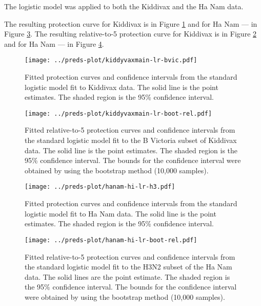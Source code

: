 The logistic model was applied to both the Kiddivax and the Ha Nam data.

The resulting protection curve for Kiddivax is in Figure \ref{fig:kiddyvaxmain-prot-lr} and for Ha Nam --- in Figure \ref{fig:hanam-prot-lr}. The resulting relative-to-5 protection curve for Kiddivax is in Figure \ref{fig:kiddyvaxmain-prot-rel-lr-boot} and for Ha Nam --- in Figure \ref{fig:hanam-prot-rel-lr-boot}.

\begin{figure}[htp]
    \centering
    \texttt{[image: ../preds-plot/kiddyvaxmain-lr-bvic.pdf]}
    \caption{
        Fitted protection curves and confidence intervals from the standard logistic model fit to Kiddivax data. The solid line is the point estimates. The shaded region is the 95\% confidence interval.
    }
    \label{fig:kiddyvaxmain-prot-lr}
\end{figure}

\begin{figure}[htp]
    \centering
    \texttt{[image: ../preds-plot/kiddyvaxmain-lr-boot-rel.pdf]}
    \caption{
        Fitted relative-to-5 protection curves and confidence intervals from the standard logistic model fit to the B Victoria subset of Kiddivax data. The solid line is the point estimates. The shaded region is the 95\% confidence interval. The bounds for the confidence interval were obtained by using the bootstrap method (10,000 samples).
    }
    \label{fig:kiddyvaxmain-prot-rel-lr-boot}
\end{figure}

\begin{figure}[htp]
    \centering
    \texttt{[image: ../preds-plot/hanam-hi-lr-h3.pdf]}
    \caption{
        Fitted protection curves and confidence intervals from the standard logistic model fit to Ha Nam data. The solid line is the point estimates. The shaded region is the 95\% confidence interval.
    }
    \label{fig:hanam-prot-lr}
\end{figure}

\begin{figure}[htp]
    \centering
    \texttt{[image: ../preds-plot/hanam-hi-lr-boot-rel.pdf]}
    \caption{
        Fitted relative-to-5 protection curves and confidence intervals from the standard logistic model fit to the H3N2 subset of the Ha Nam data. The solid lines are the point estimate. The shaded region is the 95\% confidence interval. The bounds for the confidence interval were obtained by using the bootstrap method (10,000 samples).
    }
    \label{fig:hanam-prot-rel-lr-boot}
\end{figure}

